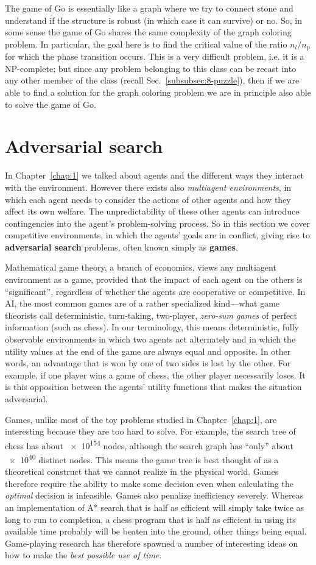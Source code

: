 The game of Go is essentially like a graph where we try to connect stone and understand if the structure is robust (in which case it can survive) or no. So, in some sense the game of Go shares the same complexity of the graph coloring problem. In particular, the goal here is to find the critical value of the ratio $n_l/n_p$ for which the phase transition occurs. This is a very difficult problem, i.e. it is a NP-complete; but since any problem belonging to this class can be recast into any other member of the class (recall Sec.~\ref{subsubsec:8-puzzle}), then if we are able to find a solution for the graph coloring problem we are in principle also able to solve the game of Go.
\section{Adversarial search}
In Chapter~\ref{chap:1} we talked about agents and the different ways they interact with the environment. However there exists also \emph{multiagent environments}, in which each agent needs to consider the actions of other agents and how they affect its own welfare. The unpredictability of these other agents can introduce contingencies into the agent's problem-solving process. So in this section we cover competitive environments, in which the agents' goals are in conflict, giving rise to \textbf{adversarial search} problems, often known simply as \textbf{games}.

Mathematical game theory, a branch of economics, views any multiagent environment as a game, provided that the impact of each agent on the others is ``significant'', regardless of whether the agents are cooperative or competitive. In AI, the most common games are of a rather specialized kind—what game theorists call deterministic, turn-taking, two-player, \emph{zero-sum games} of perfect information (such as chess). In our terminology, this means deterministic, fully observable environments in which two agents act alternately and in which the utility values at the end of the game are always equal and opposite. In other words, an advantage that is won by one of two sides is lost by the other. For example, if one player wins a game of chess, the other player necessarily loses. It is this opposition between the agents' utility functions that makes the situation adversarial.

Games, unlike most of the toy problems studied in Chapter~\ref{chap:1}, are interesting because they are too hard to solve. For example, the search tree of chess has about \num{e154} nodes, although the search graph has ``only'' about \num{e40} distinct nodes. This means the game tree is best thought of as a theoretical construct that we cannot realize in the physical world. Games therefore require the ability to make some decision even when calculating the \emph{optimal} decision is infeasible. Games also penalize inefficiency severely. Whereas an implementation of A* search that is half as efficient will simply take twice as long to run to completion, a chess
program that is half as efficient in using its available time probably will be beaten into the ground, other things being equal. Game-playing research has therefore spawned a number of interesting ideas on how to make the \emph{best possible use of time}.

